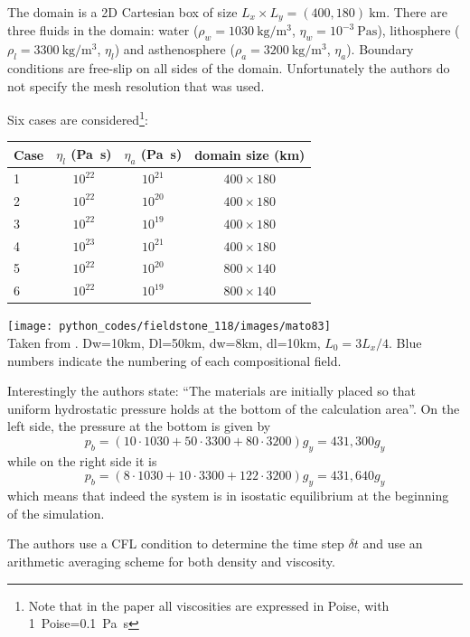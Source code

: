 The domain is a 2D Cartesian box of size $L_x \times L_y=(400,180)~\si{\km}$. 
There are three fluids in the domain: 
water ($\rho_w=1030~\si{\kg\per\cubic\meter}$, $\eta_w=10^{-3}~\si{\pascal\second}$), 
lithosphere ($\rho_l=3300~\si{\kg\per\cubic\meter}$, $\eta_l$) and 
asthenosphere ($\rho_a=3200~\si{\kg\per\cubic\meter}$, $\eta_a$).
Boundary conditions are free-slip on all sides of the domain.
Unfortunately the authors do not specify the mesh resolution that was used. 

Six cases are considered\footnote{Note that in the paper all viscosities 
are expressed in Poise, with 1~Poise=0.1~\si{\pascal\second}}:
\begin{center}
\begin{tabular}{lccc}
Case & $\eta_l$ (\si{\pascal\second}) & $\eta_a$  (\si{\pascal\second}) & domain size (\si{\km})\\
\hline
1 & $10^{22}$ & $10^{21}$ & $400\times 180$\\
2 & $10^{22}$ & $10^{20}$ & $400\times 180$\\
3 & $10^{22}$ & $10^{19}$ & $400\times 180$\\
4 & $10^{23}$ & $10^{21}$ & $400\times 180$\\
\hline
5 & $10^{22}$ & $10^{20}$ & $800\times 140$\\
6 & $10^{22}$ & $10^{19}$ & $800\times 140$\\
\hline
\end{tabular}
\end{center}

\begin{center}
\texttt{[image: python\_codes/fieldstone\_118/images/mato83]}\\
{\captionfont Taken from \textcite{mato83}. Dw=10km, Dl=50km, dw=8km, 
dl=10km, $L_0=3L_x/4$. Blue numbers indicate the numbering of each compositional field.}
\end{center}

Interestingly the authors state: ``The materials are initially placed so that 
uniform hydrostatic pressure holds at the bottom of the calculation area''. 
On the left side, the pressure at the bottom is given by 
\[
p_b=(10\cdot 1030+50\cdot 3300+80\cdot3200)g_y = 431,300g_y
\]
while on the right side it is
\[
p_b=(8\cdot 1030+10\cdot 3300+122 \cdot3200)g_y = 431,640g_y
\]
which means that indeed the system is in isostatic equilibrium at the beginning of the 
simulation. 

The authors use a CFL condition to determine the time step $\delta t$ and use an arithmetic 
averaging scheme for both density and viscosity.

